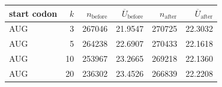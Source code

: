 \begin{center}
\small
\setlength{\tabcolsep}{6pt}
\renewcommand{\arraystretch}{1.15}
\begin{tabular}{lrrrrr}
\toprule
start codon & $k$ & $n_{\mathrm{before}}$ & $\overline{U}_{\mathrm{before}}$ & $n_{\mathrm{after}}$ & $\overline{U}_{\mathrm{after}}$ \\
\midrule
AUG & 3 & 267046 & 21.9547 & 270725 & 22.3032 \\
AUG & 5 & 264238 & 22.6907 & 270433 & 22.1618 \\
AUG & 10 & 253967 & 23.2665 & 269218 & 22.1360 \\
AUG & 20 & 236302 & 23.4526 & 266839 & 22.2208 \\
\bottomrule
\end{tabular}
\end{center}
